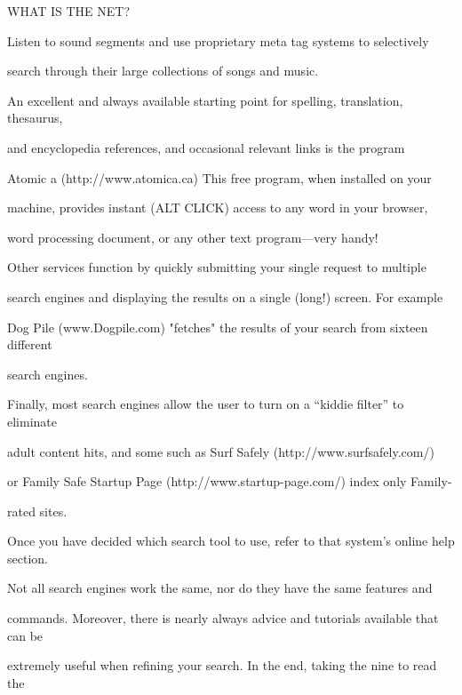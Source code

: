 \documentclass{book}
\begin{document}
\noindent \begin{flushleft}
WHAT IS THE NET?

\noindent 

\noindent Listen to sound segments and use proprietary meta tag systems to selectively

\noindent search through their large collections of songs and music.

\noindent 

\noindent An excellent and always available starting point for spelling, translation, thesaurus,

\noindent and encyclopedia references, and occasional relevant links is the program

\noindent Atomic a (http://www.atomica.ca) This free program, when installed on your

\noindent machine, provides instant (ALT CLICK) access to any word in your browser,

\noindent word processing document, or any other text program---very handy!

\noindent 

\noindent Other services function by quickly submitting your single request to multiple

\noindent search engines and displaying the results on a single (long!) screen. For example

\noindent Dog Pile (www.Dogpile.com) "fetches" the results of your search from sixteen different

\noindent search engines.

\noindent 

\noindent Finally, most search engines allow the user to turn on a ``kiddie filter'' to eliminate 

\noindent  adult content hits, and some such as Surf Safely (http://www.surfsafely.com/)

\noindent or Family Safe Startup Page (http://www.startup-page.com/) index only Family-

\noindent rated sites.

\noindent 

\noindent Once you have decided which search tool to use, refer to that system's online help section.

\noindent  Not all search engines work the same, nor do they have the same features and

\noindent commands. Moreover, there is nearly always advice and tutorials available that can be

\noindent extremely useful when refining your search. In the end, taking the nine to read the


\end{flushleft}
\end{document}
